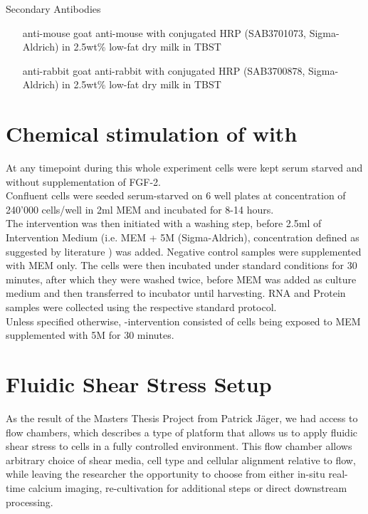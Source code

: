 Secondary Antibodies
    \begin{itemize}
		\item[anti-mouse] goat anti-mouse with conjugated HRP (SAB3701073, Sigma-Aldrich) in 2.5wt\% low-fat dry milk in TBST 
		\item[anti-rabbit] goat anti-rabbit with conjugated HRP (SAB3700878, Sigma-Aldrich) in 2.5wt\% low-fat dry milk in TBST 
    \end{itemize}



\section{Chemical stimulation of \Piezo{} with \Yoda{}}
\label{sec:ChemicalStimulation}
At any timepoint during this whole experiment cells were kept serum starved and without supplementation of FGF-2.\\
Confluent cells were seeded serum-starved on 6 well plates at concentration of 240'000 cells/well in 2ml MEM\textalpha{} and incubated for 8-14 hours.\\
The intervention was then initiated with a washing step, before 2.5ml of Intervention Medium (i.e. MEM\textalpha{} + 5\textmu{}M \Yoda (Sigma-Aldrich), concentration defined as suggested by literature \cite{Morley2018}) was added. Negative control samples were supplemented with MEM\textalpha{} only. The cells were then incubated under standard conditions for 30 minutes, after which they were washed twice, before MEM\textalpha{} was added as culture medium and then transferred to incubator until harvesting. RNA and Protein samples were collected using the respective standard protocol.\\
Unless specified otherwise, \Yoda{}-intervention consisted of cells being exposed to MEM\textalpha{} supplemented with 5\mu{}M \Yoda{} for 30 minutes. 

\section{Fluidic Shear Stress Setup}
As the result of the Masters Thesis Project from Patrick Jäger, we had access to flow chambers, which describes a type of platform that allows us to apply fluidic shear stress to cells in a fully controlled environment. This flow chamber allows arbitrary choice of shear media, cell type and cellular alignment relative to flow, while leaving the researcher the opportunity to choose from either in-situ real-time calcium imaging, re-cultivation for additional steps or direct downstream processing.

